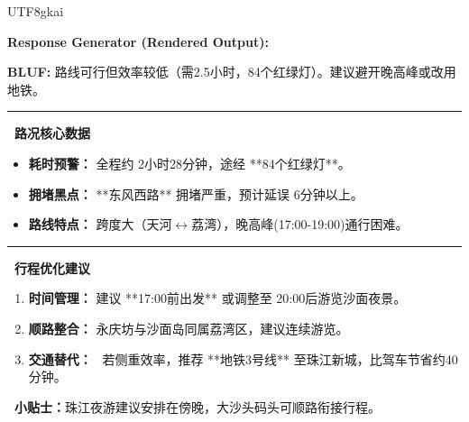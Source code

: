 \begin{CJK*}{UTF8}{gkai}
\begin{tcolorbox}[
    breakable,
    enhanced,
    colframe=color_amapblue,
    colback=mycolor,
    coltitle=white,
    title = {\textbf{Case Study: Multi-stop Route Feasibility Check}},
    fonttitle=\bfseries
]
\vspace{5pt}

\textbf{Response Generator (Rendered Output):}
\begin{tcolorbox}[colback=white, colframe=color_amapblue!30!white, arc=4pt, boxrule=1pt, left=4pt, right=4pt, top=4pt, bottom=4pt]
    \small
    \textbf{BLUF:} 路线可行但效率较低（需2.5小时，84个红绿灯）。建议避开晚高峰或改用地铁。
    
    \par\noindent\rule{\textwidth}{0.4pt}
    
    \textbf{\textcolor{color_amapblue}{\faTrafficLight\ 路况核心数据}}
    \begin{itemize}[leftmargin=12pt, itemsep=2pt, topsep=2pt]
        \item \textbf{耗时预警：} 全程约 2小时28分钟，途经 **84个红绿灯**。
        \item \textbf{拥堵黑点：} **东风西路** 拥堵严重，预计延误 6分钟以上。
        \item \textbf{路线特点：} 跨度大（天河$\leftrightarrow$荔湾），晚高峰(17:00-19:00)通行困难。
    \end{itemize}
    
    \par\noindent\rule{\textwidth}{0.4pt}
    
    \textbf{\textcolor{color_amapblue}{\faRoute\ 行程优化建议}}
    \begin{enumerate}[leftmargin=12pt, itemsep=2pt, topsep=2pt]
        \item \textbf{时间管理：} 建议 **17:00前出发** 或调整至 20:00后游览沙面夜景。
        \item \textbf{顺路整合：} 永庆坊与沙面岛同属荔湾区，建议连续游览。
        \item \textbf{交通替代：} \faSubway\ 若侧重效率，推荐 **地铁3号线** 至珠江新城，比驾车节省约40分钟。
    \end{enumerate}
    
    \vspace{3pt}
    
    \colorbox{color_amapgrey}{\parbox{\dimexpr\linewidth-6pt}{
        \scriptsize 
        \textbf{\faClock\ 小贴士：}珠江夜游建议安排在傍晚，大沙头码头可顺路衔接行程。
    }}
\end{tcolorbox}

\end{tcolorbox}




\end{CJK*}
